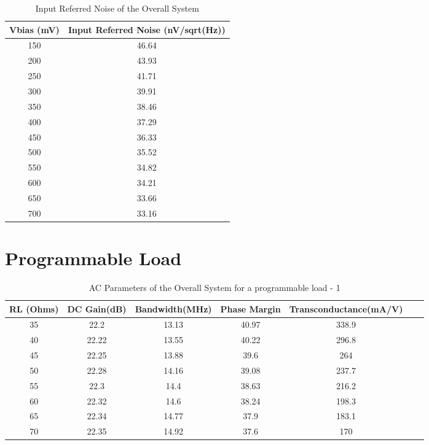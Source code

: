 \begin{table} [H]
\centering
\begin{tabular}{@{}cc@{}}
\toprule
Vbias (mV)			& Input Referred Noise (nV/sqrt(Hz))	\\ \midrule
150					& 46.64 \\
200					& 43.93 \\
250					& 41.71 \\
300					& 39.91 \\
350					& 38.46 \\
400					& 37.29 \\
450					& 36.33 \\
500					& 35.52 \\
550					& 34.82 \\
600					& 34.21 \\
650					& 33.66 \\
700 				& 33.16 \\
\bottomrule
\end{tabular}
\caption{Input Referred Noise of the Overall System}
\end{table}


\section{Programmable Load}

\begin{table} [H]
\centering
\begin{tabular}{@{}ccccccc@{}}
\toprule
RL (Ohms)		& DC Gain(dB)		& Bandwidth(MHz)		& Phase Margin			& Transconductance(mA/V)\\ \midrule
35		& 22.2 		& 13.13		& 40.97		& 338.9		\\
40		& 22.22 	& 13.55		& 40.22		& 296.8		\\
45		& 22.25 	& 13.88		& 39.6		& 264		\\
50		& 22.28 	& 14.16		& 39.08		& 237.7		\\
55		& 22.3 		& 14.4		& 38.63		& 216.2		\\
60		& 22.32 	& 14.6		& 38.24		& 198.3		\\
65		& 22.34 	& 14.77		& 37.9	 	& 183.1		\\
70		& 22.35 	& 14.92		& 37.6		& 170		\\
\bottomrule
\end{tabular}
\caption{AC Parameters of the Overall System for a programmable load - 1}
\end{table}

